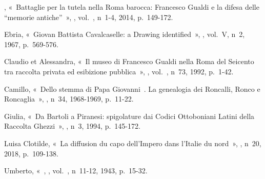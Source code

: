 \begin{teiElement}[name={TEI},change={commons\_edition}]
\begin{teiElement}[name={text},type={book},xmlid={book}]
\begin{teiElement}[name={group},type={book},xmlid={book-001}]
\begin{teiElement}[name={group},type={bibliography},data-page-title={Sources et bibliographie},data-include-href={Ch14\_Source\_bibliographie.xml},xmlid={bibliography-001}]
\begin{teiElement}[name={body}]
\begin{teiDiv}[type={section1},xmlid={div18}]
\begin{teiDiv}[type={section2},xmlid={div20}]
\begin{teiBibl}[xmlid={bibl-449}]
, « Battaglie per la tutela nella Roma barocca: Francesco Gualdi e la difesa delle “memorie antiche” », , vol. , n 1-4, 2014, p. 149-172.
\end{teiBibl}
              \begin{teiBibl}[xmlid={bibl-450}]
 Ebria, « Giovan Battista Cavalcaselle: a Drawing identified », , vol. V, n 2, 1967, p. 569-576.
\end{teiBibl}
              \begin{teiBibl}[xmlid={bibl-451}]
 Claudio et  Alessandra, « Il museo di Francesco Gualdi nella Roma del Seicento tra raccolta privata ed esibizione pubblica », , vol. , n 73, 1992, p. 1-42.
\end{teiBibl}
              \begin{teiBibl}[xmlid={bibl-452}]
 Camillo, « Dello stemma di Papa Giovanni . La genealogia dei Roncalli, Ronco e Roncaglia », , n 34, 1968-1969, p. 11-22.
\end{teiBibl}
              \begin{teiBibl}[xmlid={bibl-453}]
 Giulia, « Da Bartoli a Piranesi: spigolature dai Codici Ottoboniani Latini della Raccolta Ghezzi », , n 3, 1994, p. 145-172.
\end{teiBibl}
              \begin{teiBibl}[xmlid={bibl-454}]
 Luisa Clotilde, « La diffusion du capo dell'Impero dans l’Italie du nord », , n 20, 2018, p. 109-138.
\end{teiBibl}
              \begin{teiBibl}[xmlid={bibl-455}]
 Umberto, « , , vol. , n 11-12, 1943, p. 15-32.
\end{teiBibl}

\end{teiDiv}
\end{teiDiv}
\end{teiElement}
\end{teiElement}
\end{teiElement}
\end{teiElement}
\end{teiElement}
